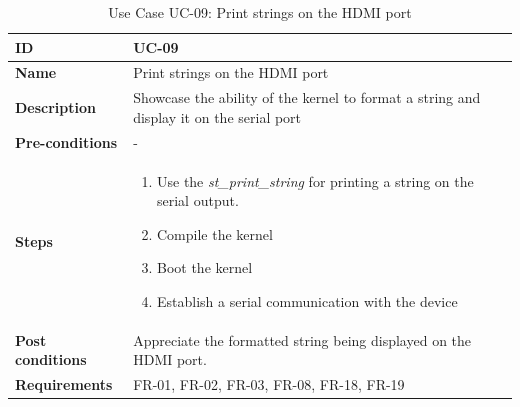 \begin{table}[H]
    \centering
    \begin{tabular}{| p{3cm} | p{7cm} |}
    \hline
    \textbf{ID}             & UC-09 \\ \hline
    \textbf{Name}           & Print strings on the HDMI port\\ \hline
    \textbf{Description}    & Showcase the ability of the kernel to format a string and display it on the serial port
	\\ \hline
    \textbf{Pre-conditions} & - \\ \hline
    \textbf{Steps}          &   \begin{enumerate}
                                    \item Use the \textit{st\_print\_string} for printing a string on the serial output. 
                                    \item Compile the kernel
                                    \item Boot the kernel
                                    \item Establish a serial communication with the device
                                \end{enumerate}
 \\ \hline
    \textbf{Post conditions} & 	Appreciate the formatted string being displayed on the HDMI port.
    							   	\\ \hline
    \textbf{Requirements}       &  FR-01, FR-02, FR-03, FR-08, FR-18, FR-19 \\ \hline
    \end{tabular}
    \caption{Use Case UC-09: Print strings on the HDMI port}
\end{table}



